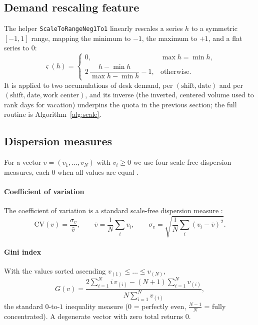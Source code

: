 \documentclass[preprint,12pt]{elsarticle}
\begin{document}
   \subsection{Demand rescaling feature}
   The helper \texttt{ScaleToRangeNeg1To1} linearly rescales a series $h$ to a symmetric $[-1,1]$ range, mapping the minimum to $-1$, the maximum to $+1$, and a flat series to $0$:
   \begin{equation}
   \varsigma(h) =
   \begin{cases}
   0, & \max h = \min h,\\[2pt]
   2\,\dfrac{h - \min h}{\max h - \min h} - 1, & \text{otherwise}.
   \end{cases}
   \end{equation}
   It is applied to two accumulations of desk demand, per $(\text{shift},\text{date})$ and per $(\text{shift},\text{date},\text{work center})$, and its inverse (the inverted, centered volume used to rank days for vacation) underpins the quota in the previous section; the full routine is Algorithm~\ref{alg:scale}.

   \subsection{Dispersion measures}
   For a vector $v=(v_1,\dots,v_N)$ with $v_i \ge 0$ we use four scale-free dispersion measures, each $0$ when all values are equal \citep{allison1978measures,cowell2011measuring}.

   \paragraph{Coefficient of variation} The coefficient of variation is a standard scale-free dispersion measure \citep{allison1978measures}:
      \begin{equation}
      \mathrm{CV}(v) = \frac{\sigma_v}{\bar v}, \qquad
      \bar v = \frac1N\sum\limits_i v_i, \qquad
      \sigma_v = \sqrt{\frac1N\sum\limits_i (v_i-\bar v)^2}.
      \end{equation}

   \paragraph{Gini index} With the values sorted ascending $v_{(1)}\le\dots\le v_{(N)}$,
      \begin{equation}
      G(v) = \frac{2\sum\limits_{i=1}^{N} i\,v_{(i)} - (N+1)\sum\limits_{i=1}^{N} v_{(i)}}
                  {N \sum\limits_{i=1}^{N} v_{(i)}},
      \end{equation}
      the standard $0$-to-$1$ inequality measure \citep{gini1921measurement,allison1978measures} ($0$ = perfectly even, $\tfrac{N-1}{N}$ = fully concentrated). A degenerate vector with zero total returns $0$.
\end{document}
